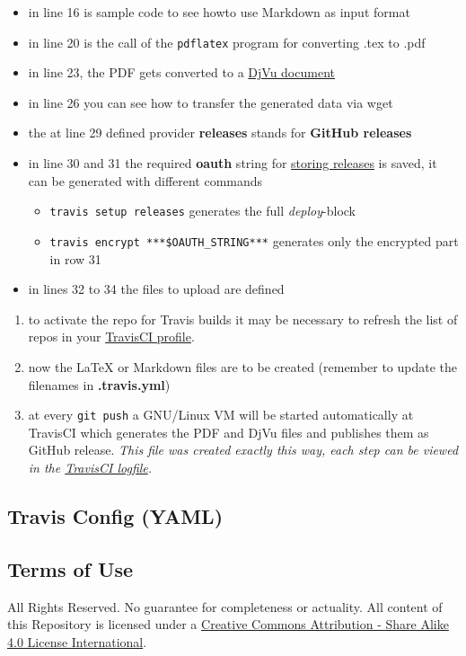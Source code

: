 \documentclass[]{article}
\providecommand{\tightlist}{
  \setlength{\itemsep}{0pt}\setlength{\parskip}{0pt}}
\begin{document}
\begin{itemize}
\tightlist
\item
  in line 16 is sample code to see howto use Markdown as input format
\item
  in line 20 is the call of the \texttt{pdflatex} program for converting
  .tex to .pdf
\item
  in line 23, the PDF gets converted to a
  \href{https://de.wikipedia.org/wiki/DjVu}{DjVu document}
\item
  in line 26 you can see how to transfer the generated data via wget
\item
  the at line 29 defined provider \textbf{releases} stands for
  \textbf{GitHub releases}
\item
  in line 30 and 31 the required \textbf{oauth} string for
  \href{http://docs.travis-ci.com/user/deployment/releases/}{storing
  releases} is saved, it can be generated with different commands

  \begin{itemize}
  \tightlist
  \item
    \texttt{travis\ setup\ releases} generates the full
    \emph{deploy}-block
  \item
    \texttt{travis\ encrypt\ ***\$OAUTH\_STRING***} generates only the
    encrypted part in row 31
  \end{itemize}
\item
  in lines 32 to 34 the files to upload are defined
\end{itemize}

\begin{enumerate}
\def\labelenumi{\arabic{enumi}.}
\tightlist
\item
  to activate the repo for Travis builds it may be necessary to refresh
  the list of repos in your
  \href{https://travis-ci.org/profile}{TravisCI profile}.
\item
  now the LaTeX or Markdown files are to be created (remember to update
  the filenames in \textbf{.travis.yml})
\item
  at every \texttt{git\ push} a GNU/Linux VM will be started
  automatically at TravisCI which generates the PDF and DjVu files and
  publishes them as GitHub release. \emph{This file was created exactly
  this way, each step can be viewed in the
  \href{https://travis-ci.org/SimonWaldherr/testrepo}{TravisCI
  logfile}.}
\end{enumerate}

\subsection{Travis Config (YAML)}\label{travis-config-yaml}



\subsection{Terms of Use}\label{terms-of-use}

All Rights Reserved. No guarantee for completeness or actuality. All
content of this Repository is licensed under a
\href{http://creativecommons.org/licenses/by-sa/4.0/}{Creative Commons
Attribution - Share Alike 4.0 License International}.
\end{document}

